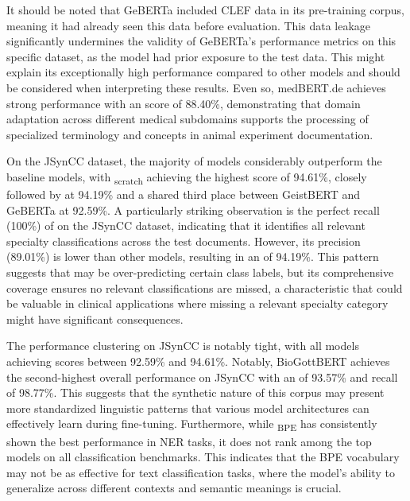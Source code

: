 It should be noted that GeBERTa included CLEF data in its pre-training corpus,
meaning it had already seen this data before evaluation. This data leakage
significantly undermines the validity of GeBERTa's performance metrics on this
specific dataset, as the model had prior exposure to the test data. This might
explain its exceptionally high performance compared to other models and should
be considered when interpreting these results. Even so, medBERT.de achieves
strong performance with an \ff{} score of 88.40\%, demonstrating that domain
adaptation across different medical subdomains supports the processing of
specialized terminology and concepts in animal experiment documentation.

On the JSynCC dataset, the majority of \ChristBERT{} models considerably
outperform the baseline models, with \ChristBERT\textsubscript{scratch}
achieving the highest \ff{} score of 94.61\%, closely followed by \ChristBERT{}
at 94.19\% and a shared third place between GeistBERT and GeBERTa at 92.59\%. A
particularly striking observation is the perfect recall (100\%) of \ChristBERT{}
on the JSynCC dataset, indicating that it identifies all relevant specialty
classifications across the test documents. However, its precision (89.01\%) is
lower than other models, resulting in an \ff{} of 94.19\%. This pattern suggests
that \ChristBERT{} may be over-predicting certain class labels, but its
comprehensive coverage ensures no relevant classifications are missed, a
characteristic that could be valuable in clinical applications where missing a
relevant specialty category might have significant consequences. 

The performance clustering on JSynCC is notably tight, with all models achieving
\ff{} scores between 92.59\% and 94.61\%. Notably, BioGottBERT achieves the
second-highest overall performance on JSynCC with an \ff{} of 93.57\% and recall
of 98.77\%. This suggests that the synthetic nature of this corpus may present
more standardized linguistic patterns that various model architectures can
effectively learn during fine-tuning. Furthermore, while
\ChristBERT\textsubscript{BPE} has consistently shown the best performance in
NER tasks, it does not rank among the top models on all classification
benchmarks. This indicates that the BPE vocabulary may not be as effective for
text classification tasks, where the model's ability to generalize across
different contexts and semantic meanings is crucial.
